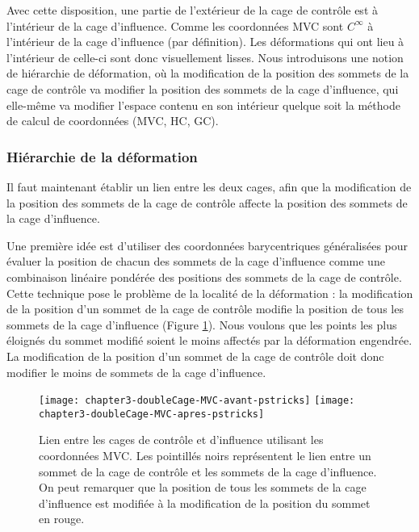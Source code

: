 Avec cette disposition, une partie de l'extérieur de la cage de contrôle est à
l'intérieur de la cage d'influence. Comme les coordonnées MVC sont
$C^{\infty}$ à l'intérieur de la cage d'influence (par définition). Les
déformations qui ont lieu à l'intérieur de celle-ci sont donc visuellement
lisses. Nous introduisons une notion de hiérarchie de déformation, où la
modification de la position des sommets de la cage de contrôle va modifier la
position des sommets de la cage d'influence, qui  elle-même va modifier
l'espace contenu en son intérieur quelque soit la méthode de calcul de
coordonnées (MVC, HC, GC). \\

\subsubsection{Hiérarchie de la déformation}

Il faut maintenant établir un lien entre les deux cages, afin que la
modification de la position des sommets de la cage de contrôle affecte la
position des sommets de la cage d'influence.

Une première idée est d'utiliser des coordonnées barycentriques généralisées
pour évaluer la position de chacun des sommets de la cage d'influence comme
une combinaison linéaire pondérée des positions des sommets de la cage de
contrôle. Cette technique pose le problème de la localité de la déformation :
la modification de la position d'un sommet de la cage de contrôle modifie la
position de tous les sommets de la cage d'influence (Figure \ref{MELDMV}).
Nous voulons que les points les plus éloignés du sommet modifié soient le
moins affectés par la déformation engendrée. La modification de la position
d'un sommet de la cage de contrôle doit donc modifier le moins de sommets de
la cage d'influence.

\begin{figure}[ht]
\begin{center}
  \texttt{[image: chapter3-doubleCage-MVC-avant-pstricks]}
  \texttt{[image: chapter3-doubleCage-MVC-apres-pstricks]}

  \caption[Lien double-cage MVC] {Lien entre les cages de contrôle et
d'influence utilisant les coordonnées MVC. Les pointillés noirs représentent
le lien entre un sommet de la cage de contrôle et les sommets de la cage
d'influence. On peut remarquer que la position de tous les sommets de la cage
d'influence est modifiée à la modification de la position du sommet en rouge.}

  \label{MELDMV}
\end{center}
\end{figure}

